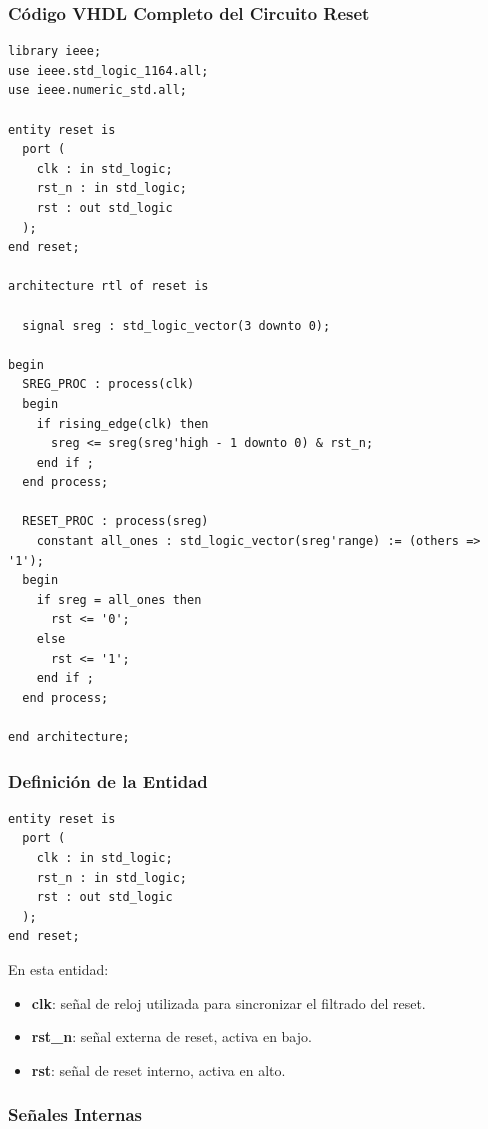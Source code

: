 \documentclass[a4paper,12pt]{article}
\begin{document}
\subsubsection{Código VHDL Completo del Circuito Reset}

\begin{lstlisting}[caption={Código completo del módulo Reset}, label={lst:reset_full}]
library ieee;
use ieee.std_logic_1164.all;
use ieee.numeric_std.all;

entity reset is
  port (
    clk : in std_logic;
    rst_n : in std_logic; 
    rst : out std_logic
  );
end reset;

architecture rtl of reset is

  signal sreg : std_logic_vector(3 downto 0);

begin
  SREG_PROC : process(clk)
  begin
    if rising_edge(clk) then
      sreg <= sreg(sreg'high - 1 downto 0) & rst_n;
    end if ;
  end process;

  RESET_PROC : process(sreg)
    constant all_ones : std_logic_vector(sreg'range) := (others => '1');
  begin
    if sreg = all_ones then
      rst <= '0';
    else
      rst <= '1';
    end if ;
  end process;

end architecture;
\end{lstlisting}

\newpage

\subsubsection{Definición de la Entidad}

\begin{lstlisting}[caption={Entidad del módulo Reset}, label={lst:reset_entity}]
entity reset is
  port (
    clk : in std_logic;
    rst_n : in std_logic; 
    rst : out std_logic
  );
end reset;
\end{lstlisting}

En esta entidad:
\begin{itemize}
    \item \textbf{clk}: señal de reloj utilizada para sincronizar el filtrado del reset.
    \item \textbf{rst\_n}: señal externa de reset, activa en bajo.
    \item \textbf{rst}: señal de reset interno, activa en alto.
\end{itemize}

\subsubsection{Señales Internas}
\end{document}
